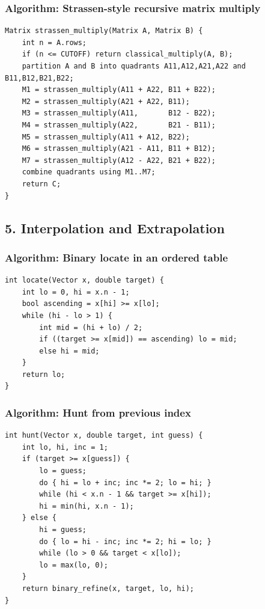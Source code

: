 \documentclass[11pt]{article}
\begin{document}
\subsubsection{Algorithm: Strassen-style recursive matrix multiply}\label{algorithm-strassen-style-recursive-matrix-multiply}

\begin{verbatim}
Matrix strassen_multiply(Matrix A, Matrix B) {
    int n = A.rows;
    if (n <= CUTOFF) return classical_multiply(A, B);
    partition A and B into quadrants A11,A12,A21,A22 and B11,B12,B21,B22;
    M1 = strassen_multiply(A11 + A22, B11 + B22);
    M2 = strassen_multiply(A21 + A22, B11);
    M3 = strassen_multiply(A11,       B12 - B22);
    M4 = strassen_multiply(A22,       B21 - B11);
    M5 = strassen_multiply(A11 + A12, B22);
    M6 = strassen_multiply(A21 - A11, B11 + B12);
    M7 = strassen_multiply(A12 - A22, B21 + B22);
    combine quadrants using M1..M7;
    return C;
}
\end{verbatim}

\subsection{5. Interpolation and Extrapolation}\label{interpolation-and-extrapolation}

\subsubsection{Algorithm: Binary locate in an ordered table}\label{algorithm-binary-locate-in-an-ordered-table}

\begin{verbatim}
int locate(Vector x, double target) {
    int lo = 0, hi = x.n - 1;
    bool ascending = x[hi] >= x[lo];
    while (hi - lo > 1) {
        int mid = (hi + lo) / 2;
        if ((target >= x[mid]) == ascending) lo = mid;
        else hi = mid;
    }
    return lo;
}
\end{verbatim}

\subsubsection{Algorithm: Hunt from previous index}\label{algorithm-hunt-from-previous-index}

\begin{verbatim}
int hunt(Vector x, double target, int guess) {
    int lo, hi, inc = 1;
    if (target >= x[guess]) {
        lo = guess;
        do { hi = lo + inc; inc *= 2; lo = hi; }
        while (hi < x.n - 1 && target >= x[hi]);
        hi = min(hi, x.n - 1);
    } else {
        hi = guess;
        do { lo = hi - inc; inc *= 2; hi = lo; }
        while (lo > 0 && target < x[lo]);
        lo = max(lo, 0);
    }
    return binary_refine(x, target, lo, hi);
}
\end{verbatim}
\end{document}

